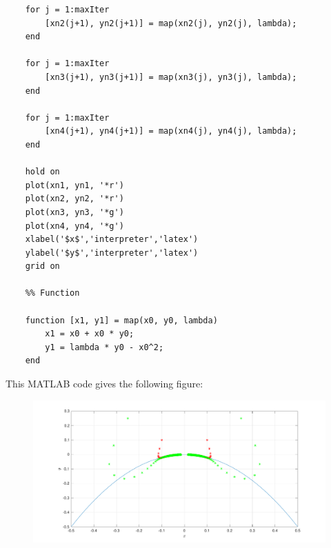 \begin{solution}[4.1]
\begin{enumerate}
\begin{verbatim}
	for j = 1:maxIter
	    [xn2(j+1), yn2(j+1)] = map(xn2(j), yn2(j), lambda);
	end
	
	for j = 1:maxIter
	    [xn3(j+1), yn3(j+1)] = map(xn3(j), yn3(j), lambda);
	end
	
	for j = 1:maxIter
	    [xn4(j+1), yn4(j+1)] = map(xn4(j), yn4(j), lambda);
	end
	
	hold on
	plot(xn1, yn1, '*r')
	plot(xn2, yn2, '*r')
	plot(xn3, yn3, '*g')
	plot(xn4, yn4, '*g')
	xlabel('$x$','interpreter','latex')
	ylabel('$y$','interpreter','latex')
	grid on
		
	%% Function
	
	function [x1, y1] = map(x0, y0, lambda)
	    x1 = x0 + x0 * y0;
	    y1 = lambda * y0 - x0^2;
	end
\end{verbatim}

This MATLAB code gives the following figure:
\begin{figure}[h]
	\centering
	\includegraphics[scale=0.5]{figures/solutions/ch4/S01D02.pdf}
\end{figure}
\end{enumerate}
\end{solution}


